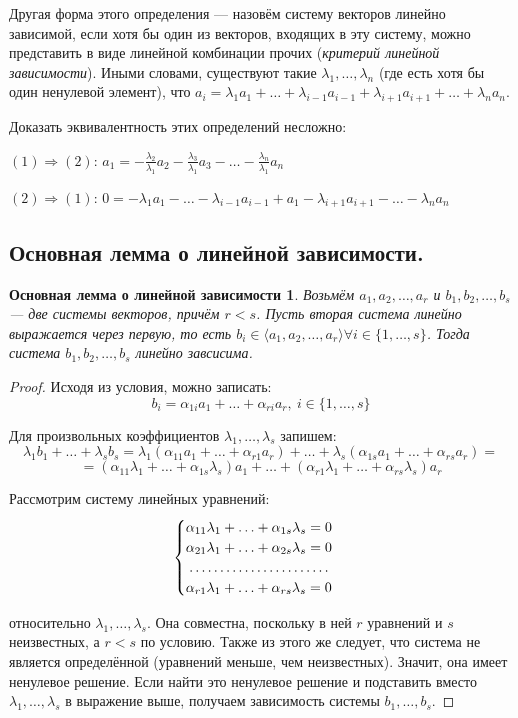 \documentclass[a4paper, 12pt]{article}
\newtheorem*{linear}{Основная лемма о линейной зависимости}
\begin{document}
Другая форма этого определения --- назовём систему векторов линейно зависимой, если хотя бы один из векторов, входящих в эту систему, можно представить в виде линейной комбинации прочих (\textit{критерий линейной зависимости}). Иными словами, существуют такие $\lambda_1, \ldots, \lambda_n$ (где есть хотя бы один ненулевой элемент), что $a_i = \lambda_1a_1 + \ldots + \lambda_{i-1}a_{i-1} + \lambda_{i+1}a_{i+1} + \ldots + \lambda_na_n$.

Доказать эквивалентность этих определений несложно:

\vspace{0.5cm}
$(1)\Rightarrow(2)$: $a_1 = -\frac{\lambda_2}{\lambda_1}a_2 - \frac{\lambda_3}{\lambda_1}a_3 - \ldots - \frac{\lambda_n}{\lambda_1}a_n$

$(2)\Rightarrow(1)$: $0 = -\lambda_1a_1 - \ldots - \lambda_{i-1}a_{i-1} + a_1 - \lambda_{i+1}a_{i+1} - \ldots - \lambda_na_n$


\subsection{Основная лемма о линейной зависимости.}
\begin{linear}
Возьмём $a_1, a_2, \ldots ,a_r$ и $b_1, b_2, \ldots ,b_s$ --- две системы векторов, причём $r < s$. Пусть вторая система линейно выражается через первую, то есть $b_i \in \langle a_1, a_2, \ldots , a_r \rangle \forall i \in \{1, \ldots , s\}$. Тогда система $b_1, b_2, \ldots ,b_s$ линейно завсисима.
\end{linear}
\begin{proof}
Исходя из условия, можно записать:
\[b_i = \alpha_{1i}a_1 + \ldots + \alpha_{ri}a_r,\   i \in \{ 1, \ldots ,s\}
\]

Для произвольных коэффициентов $\lambda_1, \ldots, \lambda_s$ запишем:
\[\lambda_1 b_1 + \ldots + \lambda_s b_s = \lambda_1(\alpha_{11}a_1 + \ldots + \alpha_{r1}a_r) + \ldots + \lambda_s(\alpha_{1s}a_1 + \ldots + \alpha_{rs}a_r) = \]
\[= (\alpha_{11}\lambda_1 + \ldots + \alpha_{1s}\lambda_s)a_1 + \ldots + (\alpha_{r1}\lambda_1 + \ldots + \alpha_{rs}\lambda_s)a_r\]

Рассмотрим систему линейных уравнений:
\[\begin{cases}
\alpha_{11}\lambda_1 + \ldots + \alpha_{1s}\lambda_s = 0 \\
\alpha_{21}\lambda_1 + \ldots + \alpha_{2s}\lambda_s = 0 \\
\dotfill \\
\alpha_{r1}\lambda_1 + \ldots + \alpha_{rs}\lambda_s = 0 
\end{cases}\]

относительно $\lambda_1, \ldots,\lambda_s$. Она совместна, поскольку в ней $r$ уравнений и $s$ неизвестных, а $r < s$ по условию. Также из этого же следует, что система не является определённой (уравнений меньше, чем неизвестных). Значит, она имеет ненулевое решение. Если найти это ненулевое решение и подставить вместо $\lambda_1, \ldots ,\lambda_s$ в выражение выше, получаем зависимость системы $b_1, \ldots ,b_s$. \end{proof}
\end{document}
